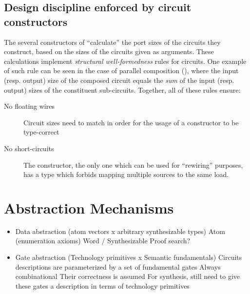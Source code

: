         \subsection{Design discipline enforced by circuit constructors}
            The several constructors of  ``calculate'' the port sizes of the circuits they construct,
            based on the sizes of the circuits given as arguments.
            These calculations implement \emph{structural well-formedness} rules for circuits.
            One example of such rule can be seen in the case of parallel composition (),
            where the input (resp. output) size of the composed circuit equals the \emph{sum}
            of the input (resp. output) sizes of the constituent sub-circuits.
            Together, all of these rules ensure:

            \begin{description}
                \item[No floating wires] Circuit sizes need to match in order for the usage of a constructor
                    to be type-correct
                \item [No short-circuits] The  constructor, the only one which can be used for
                    ``rewiring'' purposes, has a type which forbids mapping multiple sources to the same load.
            \end{description}


    \section{Abstraction Mechanisms}
    \label{sec:circuit-abstraction}
        \begin{itemize}
            \item Data abstraction (atom vectors x arbitrary synthesizable types)
                \subitem Atom (enumeration axioms)
                \subitem Word / Synthesizable
                    \subsubitem Proof search?
            \item Gate abstraction (Technology primitives x Semantic fundamentals)
                \subitem Circuits descriptions are parameterized by a set of fundamental gates
                    \subsubitem Always combinational
                    \subsubitem Their correctness is assumed
                \subitem For synthesis, still need to give these gates a description in terms of technology primitives
        \end{itemize}

